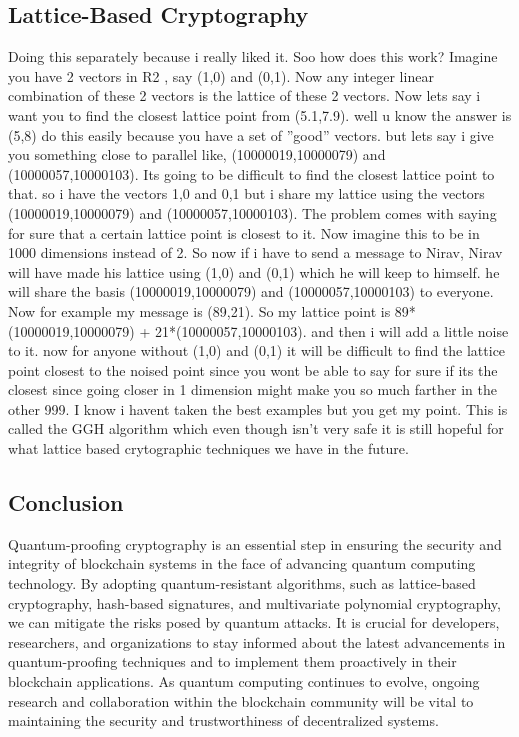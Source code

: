 \documentclass[12pt, a4paper]{article}
\begin{document}
\subsection{Lattice-Based Cryptography}
Doing this separately because i really liked it. Soo how does this work? Imagine you have 2 vectors in R2 , say (1,0) and (0,1). Now any integer linear combination of these 2 vectors is the lattice of these 2 vectors. Now lets say i want you to find the closest lattice point from (5.1,7.9). well u know the answer is (5,8) do this easily because you have a set of ”good” vectors. but lets say i give you something close to parallel like, (10000019,10000079) and (10000057,10000103). Its going to be difficult to find the closest lattice point to that. so i have the vectors 1,0 and 0,1 but i share my lattice using the
vectors (10000019,10000079) and (10000057,10000103). The problem comes with saying
for sure that a certain lattice point is closest to it. Now imagine this to be in 1000
dimensions instead of 2.
\newline
So now if i have to send a message to Nirav, Nirav will have made his lattice using (1,0) and (0,1) which he will keep to himself. he will share the basis (10000019,10000079) and (10000057,10000103) to everyone. Now for example my message is (89,21). So my lattice point is 89*(10000019,10000079) + 21*(10000057,10000103). and then i will add a little noise to it. now for anyone without (1,0) and (0,1) it will be difficult to find the lattice point closest to the noised point since you wont be able to say for sure if its the closest since going closer in 1 dimension might make you so much farther in the other 999. I know i havent taken the best examples but you get my point. This is called the GGH algorithm which even though isn’t very safe it is still hopeful for what lattice based crytographic techniques we have in the future.
\subsection{Conclusion}
Quantum-proofing cryptography is an essential step in ensuring the security and integrity of blockchain systems in the face of advancing quantum computing technology. By adopting quantum-resistant algorithms, such as lattice-based cryptography, hash-based signatures, and multivariate polynomial cryptography, we can mitigate the risks posed by quantum attacks. It is crucial for developers, researchers, and organizations to stay informed about the latest advancements in quantum-proofing techniques and to implement them proactively in their blockchain applications. As quantum computing continues to evolve, ongoing research and collaboration within the blockchain community will be vital to maintaining the security and trustworthiness of decentralized systems.
\end{document}
